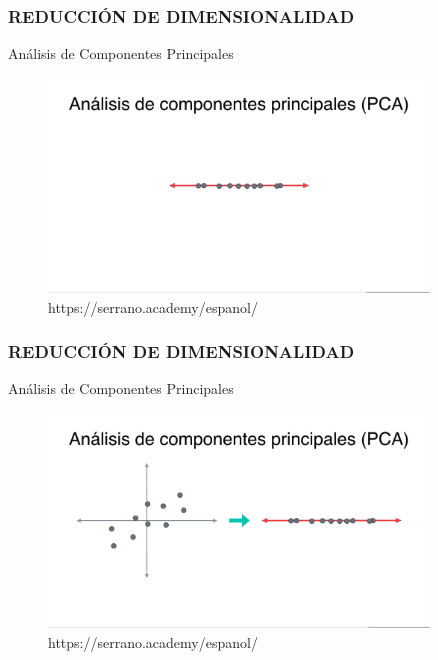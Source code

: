 \documentclass{beamer}
\begin{document}
\begin{frame}
	\frametitle{REDUCCIÓN DE DIMENSIONALIDAD}
	\begin{block}{Análisis de Componentes Principales}	
		\begin{figure}
			\includegraphics[width=0.9\textwidth]{PCA/IMG_3588.jpg}
			\caption{https://serrano.academy/espanol/}
		\end{figure}
	\end{block}
\end{frame}

\begin{frame}
	\frametitle{REDUCCIÓN DE DIMENSIONALIDAD}
	\begin{block}{Análisis de Componentes Principales}	
		\begin{figure}
			\includegraphics[width=0.9\textwidth]{PCA/IMG_3589.jpg}
			\caption{https://serrano.academy/espanol/}
		\end{figure}
	\end{block}
\end{frame}
\end{document}
